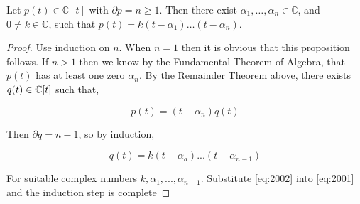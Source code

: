 \begin{proposition}
	Let $p(t) \in \mathbb{C}[t]$ with $\partial p=n \geq 1$. Then there exist $\alpha_1, \ldots, \alpha_n \in \mathbb{C}$, and $0 \neq k \in \mathbb{C}$, such that
	$
	p(t)=k\left(t-\alpha_1\right) \ldots\left(t-\alpha_n\right).
	$
\end{proposition}

\begin{proof}
	Use induction on $n$. When $n = 1$ then it is obvious that this proposition follows. If $n > 1$ then we know by the Fundamental Theorem of Algebra, that $p(t)$ has at least one zero $\alpha_n$. By the Remainder Theorem above, there exists $q(t) \in \mathbb C[t]$ such that,
	
	\begin{equation} \label{eq:2001}
		p(t) = (t-\alpha_n) q(t)
	\end{equation}
	
	Then $\partial q = n - 1$, so by induction,
	
	\begin{equation} \label{eq:2002}
		q(t) = k(t-\alpha_a)...(t-\alpha_{n-1})
	\end{equation}     
	
	For suitable complex numbers $k,\alpha_1,...,\alpha_{n-1}$. Substitute \ref{eq:2002} into \ref{eq:2001} and the induction step is complete
\end{proof}